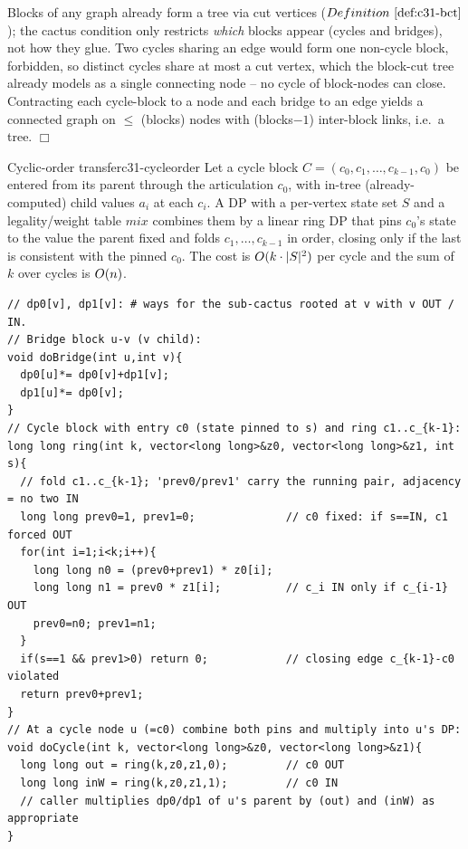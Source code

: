 \begin{proofbox}
Blocks of any graph already form a tree via cut vertices (\(\defref{c31-bct}\)); the
cactus condition only restricts \emph{which} blocks appear (cycles and bridges), not
how they glue.  Two cycles sharing an edge would form one non-cycle block, forbidden,
so distinct cycles share at most a cut vertex, which the block-cut tree already
models as a single connecting node -- no cycle of block-nodes can close.  Contracting
each cycle-block to a node and each bridge to an edge yields a connected graph on
\(\le\) (blocks) nodes with (blocks\(-1\)) inter-block links, i.e.\ a tree. \(\Box\)
\end{proofbox}

\begin{lemma}{Cyclic-order transfer}{c31-cycleorder}
Let a cycle block \(C=(c_0,c_1,\dots,c_{k-1},c_0)\) be entered from its parent through
the articulation \(c_0\), with in-tree (already-computed) child values \(a_i\) at each
\(c_i\).  A DP with a per-vertex state set \(S\) and a legality/weight table
\(\mathit{mix}\) combines them by a linear ring DP that pins \(c_0\)'s state to the
value the parent fixed and folds \(c_1,\dots,c_{k-1}\) in order, closing only if the
last is consistent with the pinned \(c_0\).  The cost is \(O(k\cdot|S|^2)\) per
cycle and the sum of \(k\) over cycles is \(O(n)\).
\end{lemma}

\begin{lstlisting}[caption={Cactus DP skeleton: pop blocks; a bridge is a tree-edge update, a cycle runs a ring transfer with the entry vertex pinned to each candidate state and the best taken. States here are in/out for independent sets. ASCII only, identifiers without underscores}, label={lst:c31-cactusdp}]
// dp0[v], dp1[v]: # ways for the sub-cactus rooted at v with v OUT / IN.
// Bridge block u-v (v child):
void doBridge(int u,int v){
  dp0[u]*= dp0[v]+dp1[v];
  dp1[u]*= dp0[v];
}
// Cycle block with entry c0 (state pinned to s) and ring c1..c_{k-1}:
long long ring(int k, vector<long long>&z0, vector<long long>&z1, int s){
  // fold c1..c_{k-1}; 'prev0/prev1' carry the running pair, adjacency = no two IN
  long long prev0=1, prev1=0;              // c0 fixed: if s==IN, c1 forced OUT
  for(int i=1;i<k;i++){
    long long n0 = (prev0+prev1) * z0[i];
    long long n1 = prev0 * z1[i];          // c_i IN only if c_{i-1} OUT
    prev0=n0; prev1=n1;
  }
  if(s==1 && prev1>0) return 0;            // closing edge c_{k-1}-c0 violated
  return prev0+prev1;
}
// At a cycle node u (=c0) combine both pins and multiply into u's DP:
void doCycle(int k, vector<long long>&z0, vector<long long>&z1){
  long long out = ring(k,z0,z1,0);         // c0 OUT
  long long inW = ring(k,z0,z1,1);         // c0 IN
  // caller multiplies dp0/dp1 of u's parent by (out) and (inW) as appropriate
}
\end{lstlisting}

